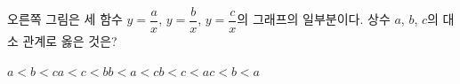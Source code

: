 \hspace*{2mm}\begin{minipage}[t]{\dimexpr\linewidth-2mm\relax}\vspace{0pt}
\noindent\begin{minipage}[t]{0.58\linewidth}\vspace{0pt}\raggedright 오른쪽 그림은 세 함수 $y=\dfrac{a}{x}$, $y=\dfrac{b}{x}$, $y=\dfrac{c}{x}$의 그래프의 일부분이다. 상수 $a$, $b$, $c$의 대소 관계로 옳은 것은?\end{minipage}\hfill\begin{minipage}[t]{0.4\linewidth}\vspace{0pt}\centering \resizebox{\ifdim\width>\linewidth\linewidth\else\width\fi}{!}{}\end{minipage}\par
\begin{choicesii}{$a<b<c$}{$a<c<b$}{$b<a<c$}{$b<c<a$}{$c<b<a$}\end{choicesii}\end{minipage}
